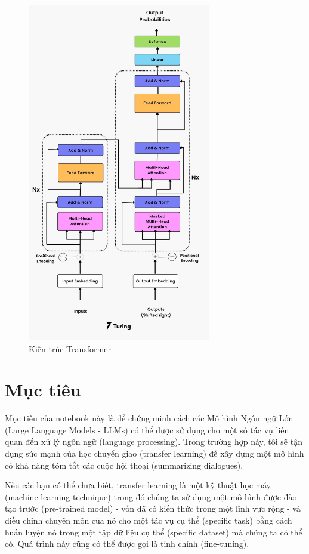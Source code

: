 \begin{figure}[htp]
    \centering
    \includegraphics[width=8cm]{images/Transformer_architecture.png}
    \caption{Kiến trúc Transformer}
    \end{figure}

\section{Mục tiêu}
Mục tiêu của notebook này là để chứng minh cách các Mô hình Ngôn ngữ Lớn (Large Language Models - LLMs) có thể được sử dụng cho một số tác vụ liên quan đến xử lý ngôn ngữ (language processing). Trong trường hợp này, tôi sẽ tận dụng sức mạnh của học chuyển giao (transfer learning) để xây dựng một mô hình có khả năng tóm tắt các cuộc hội thoại (summarizing dialogues).

Nếu các bạn có thể chưa biết, transfer learning là một kỹ thuật học máy (machine learning technique) trong đó chúng ta sử dụng một mô hình được đào tạo trước (pre-trained model) - vốn đã có kiến thức trong một lĩnh vực rộng - và điều chỉnh chuyên môn của nó cho một tác vụ cụ thể (specific task) bằng cách huấn luyện nó trong một tập dữ liệu cụ thể (specific dataset) mà chúng ta có thể có. Quá trình này cũng có thể được gọi là tinh chỉnh (fine-tuning).


